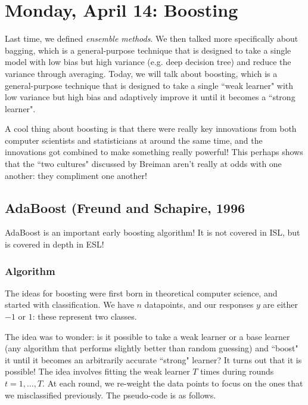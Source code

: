 \section{Monday, April 14: Boosting}

Last time, we defined \emph{ensemble methods}. We then talked more specifically about bagging, which is a general-purpose technique that is designed to take a single model with low bias but high variance (e.g. deep decision tree) and reduce the variance through averaging. Today, we will talk about boosting, which is a general-purpose technique that is designed to take a single ``weak learner" with low variance but high bias and adaptively improve it until it becomes a ``strong learner". 

A cool thing about boosting is that there were really key innovations from both computer scientists and statisticians at around the same time, and the innovations got combined to make something really powerful! This perhaps shows that the ``two cultures" discussed by Breiman aren't really at odds with one another: they compliment one another! 


\subsection{AdaBoost (Freund and Schapire, 1996}

AdaBoost is an important early boosting algorithm! It is not covered in ISL, but is covered in depth in ESL!

\subsubsection{Algorithm}

The ideas for boosting were first born in theoretical computer science, and started with classification. We have $n$ datapoints, and our responses $y$ are either $-1$ or $1$: these represent two classes. 

The idea was to wonder: is it possible to take a weak learner or a base learner (any algorithm that performs slightly better than random guessing) and ``boost" it until it becomes an arbitrarily accurate ``strong" learner? It turns out that it is possible! The idea involves fitting the weak learner $T$ times during rounds $t=1,\ldots,T$. At each round, we re-weight the data points to focus on the ones that we misclassified previously. The pseudo-code is as follows.

